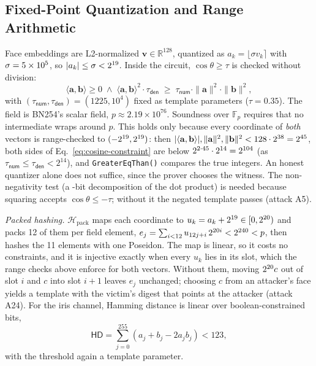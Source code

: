 \documentclass[10pt,letterpaper,journal]{IEEEtran}
\begin{document}
\subsection{Fixed-Point Quantization and Range Arithmetic}
Face embeddings are L2-normalized $\mathbf{v} \in \mathbb{R}^{128}$, quantized as $a_k = \lfloor \sigma v_k \rceil$ with $\sigma = 5 \times 10^{5}$, so $|a_k| \le \sigma < 2^{19}$. Inside the circuit, $\cos\theta \geq \tau$ is checked without division:
\begin{equation}
  \langle \mathbf{a}, \mathbf{b} \rangle \geq 0 \;\wedge\; \langle \mathbf{a}, \mathbf{b} \rangle^2 \cdot \tau_{\mathsf{den}} \;\geq\; \tau_{\mathsf{num}} \cdot \|\mathbf{a}\|^2 \cdot \|\mathbf{b}\|^2, \label{eq:cosine-constraint}
\end{equation}
with $(\tau_{\mathsf{num}}, \tau_{\mathsf{den}}) = (1225, 10^4)$ fixed as template parameters ($\tau = 0.35$). The field is BN254's scalar field, $p \approx 2.19 \times 10^{76}$. Soundness over $\mathbb{F}_p$ requires that no intermediate wraps around $p$. This holds only because every coordinate of \emph{both} vectors is range-checked to $(-2^{19}, 2^{19})$: then $|\langle \mathbf{a}, \mathbf{b}\rangle|, \|\mathbf{a}\|^2, \|\mathbf{b}\|^2 < 128 \cdot 2^{38} = 2^{45}$, both sides of Eq.~\eqref{eq:cosine-constraint} are below $2^{2 \cdot 45} \cdot 2^{14} = 2^{104}$ (as $\tau_{\mathsf{num}} \le \tau_{\mathsf{den}} < 2^{14}$), and \texttt{GreaterEqThan(\nCmpBits)} compares the true integers. An honest quantizer alone does not suffice, since the prover chooses the witness. The non-negativity test (a \nDotBits-bit decomposition of the dot product) is needed because squaring accepts $\cos\theta \le -\tau$; without it the negated template passes (attack A5).

\emph{Packed hashing.} $\mathcal{H}_{\text{pack}}$ maps each coordinate to $u_k = a_k + 2^{19} \in [0, 2^{20})$ and packs 12 of them per field element, $e_j = \sum_{i<12} u_{12j+i} \, 2^{20 i} < 2^{240} < p$, then hashes the 11 elements with one Poseidon. The map is linear, so it costs no constraints, and it is injective exactly when every $u_k$ lies in its slot, which the range checks above enforce for both vectors. Without them, moving $2^{20} c$ out of slot $i$ and $c$ into slot $i+1$ leaves $e_j$ unchanged; choosing $c$ from an attacker's face yields a template with the victim's digest that points at the attacker (attack A24).
For the iris channel, Hamming distance is linear over boolean-constrained bits,
\begin{equation}
  \mathsf{HD} = \sum_{j=0}^{255}(a_j + b_j - 2a_jb_j) < 123, \label{eq:hd}
\end{equation}
with the threshold again a template parameter.
\end{document}
